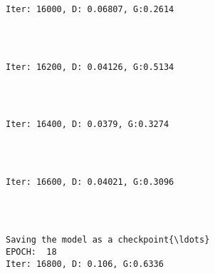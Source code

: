 \documentclass[11pt]{article}
\begin{document}
    \begin{Verbatim}[commandchars=\\\{\}]

Iter: 16000, D: 0.06807, G:0.2614
    \end{Verbatim}

    \begin{center}
    \end{center}
    { \hspace*{\fill} \\}
    
    \begin{Verbatim}[commandchars=\\\{\}]

Iter: 16200, D: 0.04126, G:0.5134
    \end{Verbatim}

    \begin{center}
    \end{center}
    { \hspace*{\fill} \\}
    
    \begin{Verbatim}[commandchars=\\\{\}]

Iter: 16400, D: 0.0379, G:0.3274
    \end{Verbatim}

    \begin{center}
    \end{center}
    { \hspace*{\fill} \\}
    
    \begin{Verbatim}[commandchars=\\\{\}]

Iter: 16600, D: 0.04021, G:0.3096
    \end{Verbatim}

    \begin{center}
    \end{center}
    { \hspace*{\fill} \\}
    
    \begin{Verbatim}[commandchars=\\\{\}]

Saving the model as a checkpoint{\ldots}
EPOCH:  18
Iter: 16800, D: 0.106, G:0.6336
    \end{Verbatim}
\end{document}
